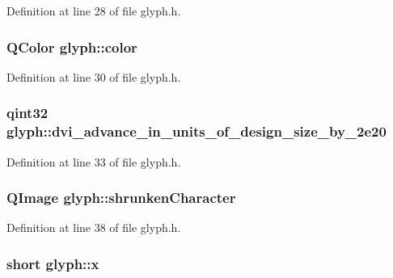 Definition at line 28 of file glyph.\+h.

\hypertarget{classglyph_ab4847af7a7b13322d5651fe47735c8dd}{
\subsubsection[{color}]{\setlength{\rightskip}{0pt plus 5cm}Q\+Color glyph\+::color}}\label{classglyph_ab4847af7a7b13322d5651fe47735c8dd}


Definition at line 30 of file glyph.\+h.

\hypertarget{classglyph_ad5d39f93c1c63bd072b23783cd9ac7ce}{
\subsubsection[{dvi\+\_\+advance\+\_\+in\+\_\+units\+\_\+of\+\_\+design\+\_\+size\+\_\+by\+\_\+2e20}]{\setlength{\rightskip}{0pt plus 5cm}qint32 glyph\+::dvi\+\_\+advance\+\_\+in\+\_\+units\+\_\+of\+\_\+design\+\_\+size\+\_\+by\+\_\+2e20}}\label{classglyph_ad5d39f93c1c63bd072b23783cd9ac7ce}


Definition at line 33 of file glyph.\+h.

\hypertarget{classglyph_aeefa28a926bdd7a24595dbdc7cdf504c}{
\subsubsection[{shrunken\+Character}]{\setlength{\rightskip}{0pt plus 5cm}Q\+Image glyph\+::shrunken\+Character}}\label{classglyph_aeefa28a926bdd7a24595dbdc7cdf504c}


Definition at line 38 of file glyph.\+h.

\hypertarget{classglyph_aa030c1619dd07d04f843c5ee9a54dde1}{
\subsubsection[{x}]{\setlength{\rightskip}{0pt plus 5cm}short glyph\+::x}}\label{classglyph_aa030c1619dd07d04f843c5ee9a54dde1}


